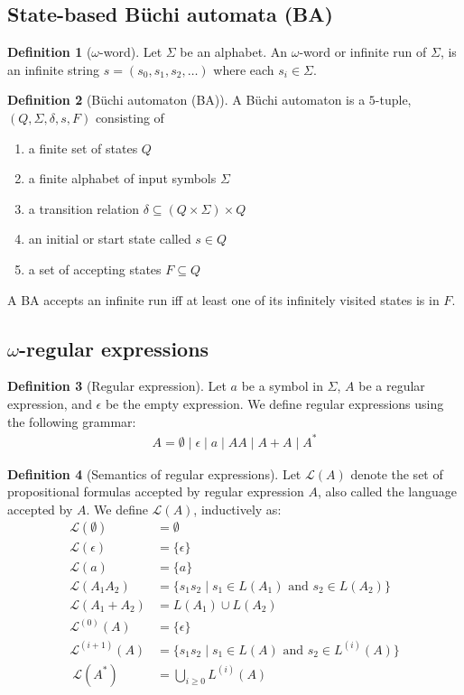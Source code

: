 \documentclass[conference]{IEEEtran}
\theoremstyle{definition}
\newtheorem{definition}{Definition}[section]
\theoremstyle{remark}
\newcommand{\Buchi}{B\"{u}chi }
\renewcommand{\L}{\mathscr{L}}
\begin{document}
\subsection{State-based \Buchi automata (BA)}
\begin{definition}[$\omega$-word]
    Let $\Sigma$ be an alphabet. An $\omega$-word or infinite run of $\Sigma$, is an infinite string $s = (s_0, s_1, s_2, \dots)$ where each $s_i\in \Sigma$.
\end{definition}
\begin{definition}[\Buchi automaton (BA)]
    A \Buchi automaton is a $5$-tuple, $(Q, \Sigma, \delta, s, F)$ consisting of
    \begin{enumerate}
        \item a finite set of states $Q$
        \item a finite alphabet of input symbols $\Sigma$
        \item a transition relation $\delta \subseteq (Q\times \Sigma) \times Q$
        \item an initial or start state called $s\in Q$
        \item a set of accepting states $F \subseteq Q$
    \end{enumerate}
    A BA accepts an infinite run iff at least one of its infinitely visited states is in $F$.
\end{definition}

\subsection{$\omega$-regular expressions}
\begin{definition}[Regular expression]\label{def:regex}
    Let $a$ be a symbol in $\Sigma$, $A$ be a regular expression, and $\epsilon$ be the empty expression. We define regular expressions using the following grammar:
    \begin{align*}
        A = \emptyset \mid \epsilon \mid a \mid AA \mid A + A \mid A^*
    \end{align*}
\end{definition}
\begin{definition}[Semantics of regular expressions]
    Let $\L(A)$ denote the set of propositional formulas accepted by regular expression $A$, also called the language accepted by $A$. We define $\L(A)$, inductively as:
    \begin{align*}
        \L(\emptyset) & = \emptyset \\
        \L(\epsilon) & = \{\epsilon\} \tag{$\epsilon$ denotes the empty string}\\
        \L(a) & = \{a\} \\
        \L(A_1A_2) & = \{s_1s_2 \mid s_1 \in L(A_1) \text{ and } s_2 \in L(A_2)\} \\
        \L(A_1 + A_2) & = L(A_1) \cup L(A_2) \\
        \L^{(0)}(A) & = \{\epsilon\} \\
        \L^{(i + 1)}(A) & = \{s_1s_2 \mid s_1 \in L(A) \text{ and } s_2 \in L^{(i)}(A)\} \\\
        \L(A^*) & = \bigcup_{i \ge 0} L^{(i)}(A)
    \end{align*}
\end{definition}
\end{document}
